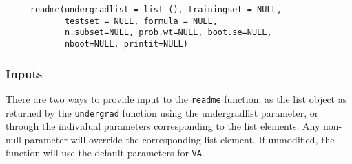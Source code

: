 \documentclass[oneside,letterpaper,titlepage]{article}
\begin{document}
\begin{verbatim}
     readme(undergradlist = list (), trainingset = NULL, 
            testset = NULL, formula = NULL, 
            n.subset=NULL, prob.wt=NULL, boot.se=NULL, 
            nboot=NULL, printit=NULL)
\end{verbatim}

\subsubsection{Inputs}

There are two ways to provide input to the \texttt{readme} function:
as the list object as returned by the \texttt{undergrad} function
using the undergradlist parameter, or through the individual
parameters corresponding to the list elements. Any non-null parameter
will override the corresponding list element.  If unmodified, the
function will use the default parameters for \texttt{VA}.
\end{document}
